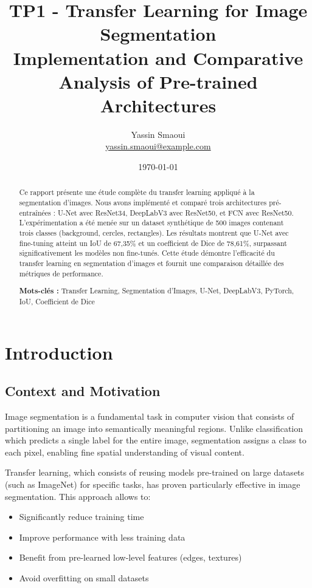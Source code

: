 \documentclass[12pt,a4paper]{article}
\title{\textbf{TP1 - Transfer Learning for Image Segmentation} \\
\large Implementation and Comparative Analysis of Pre-trained Architectures}
\author{Yassin Smaoui \\
\small \href{mailto:yassin.smaoui@example.com}{yassin.smaoui@example.com}}
\date{\today}
\begin{document}
\maketitle

\begin{abstract}
Ce rapport présente une étude complète du transfer learning appliqué à la segmentation d'images. Nous avons implémenté et comparé trois architectures pré-entraînées : U-Net avec ResNet34, DeepLabV3 avec ResNet50, et FCN avec ResNet50. L'expérimentation a été menée sur un dataset synthétique de 500 images contenant trois classes (background, cercles, rectangles). Les résultats montrent que U-Net avec fine-tuning atteint un IoU de 67,35\% et un coefficient de Dice de 78,61\%, surpassant significativement les modèles non fine-tunés. Cette étude démontre l'efficacité du transfer learning en segmentation d'images et fournit une comparaison détaillée des métriques de performance.

\textbf{Mots-clés :} Transfer Learning, Segmentation d'Images, U-Net, DeepLabV3, PyTorch, IoU, Coefficient de Dice
\end{abstract}

\tableofcontents
\newpage

\section{Introduction}

\subsection{Context and Motivation}

Image segmentation is a fundamental task in computer vision that consists of partitioning an image into semantically meaningful regions. Unlike classification which predicts a single label for the entire image, segmentation assigns a class to each pixel, enabling fine spatial understanding of visual content.

Transfer learning, which consists of reusing models pre-trained on large datasets (such as ImageNet) for specific tasks, has proven particularly effective in image segmentation. This approach allows to:
\begin{itemize}
    \item Significantly reduce training time
    \item Improve performance with less training data
    \item Benefit from pre-learned low-level features (edges, textures)
    \item Avoid overfitting on small datasets
\end{itemize}
\end{document}
